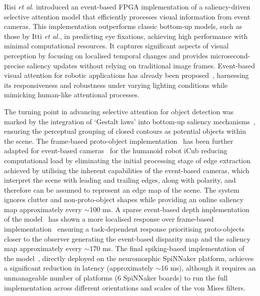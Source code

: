 Risi \emph{et al.}\cite{9948687} introduced an event-based FPGA implementation of a saliency-driven selective attention model that efficiently processes visual information from event cameras. This implementation outperforms classic bottom-up models, such as those by Itti \emph{et al.}\cite{itti1998model, itti2001computational}, in predicting eye fixations, achieving high performance with minimal computational resources. It captures significant aspects of visual perception by focusing on localised temporal changes and provides microsecond-precise saliency updates without relying on traditional image frames.
Event-based visual attention for robotic applications has already been proposed~\cite{rea2013event}, harnessing its responsiveness and robustness under varying lighting conditions while mimicking human-like attentional processes. 

The turning point in advancing selective attention for object detection was marked by the integration of `Gestalt laws' into bottom-up saliency mechanisms~\cite{russell2014model}, ensuring the perceptual grouping of closed contours as potential objects within the scene.
The frame-based proto-object implementation~\cite{russell2014model} has been further adapted for event-based cameras~\cite{iacono2019proto} for the humanoid robot iCub reducing computational load by eliminating the initial processing stage of edge extraction achieved by utilising the inherent capabilities of the event-based cameras, which interpret the scene with leading and trailing edges, along with polarity, and therefore can be assumed to represent an edge map of the scene. The system ignores clutter and non-proto-object shapes while providing an online saliency map approximately every $\sim$100 ms.
A sparse event-based depth implementation of the model~\cite{ghosh2022event} has shown a more localised response over frame-based implementation~\cite{hu2016proto} ensuring a task-dependent response prioritising proto-objects closer to the observer generating the event-based disparity map and the saliency map approximately every $\sim$170 ms. The final spiking-based implementation of the model~\cite{Dangelo_etal22}, directly deployed on the neuromorphic SpiNNaker platform, achieves a significant reduction in latency (approximately $\sim$16 ms), although it requires an unmanageable number of platforms (6 SpiNNaker boards) to run the full implementation across different orientations and scales of the von Mises filters.

